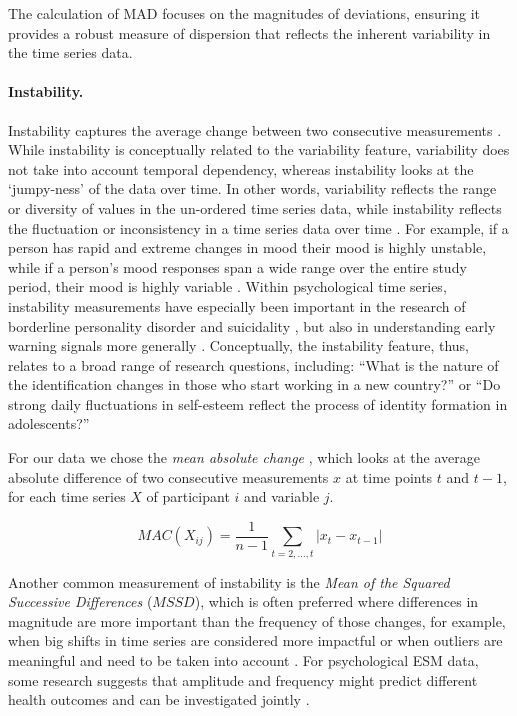 The calculation of MAD focuses on the magnitudes of deviations, ensuring
it provides a robust measure of dispersion that reflects the inherent
variability in the time series data.

\paragraph{Instability.}

Instability captures the average change between two consecutive
measurements \citep{ebner-priemer2009, jahng2008}. While instability is
conceptually related to the variability feature, variability does not
take into account temporal dependency, whereas instability looks at the
`jumpy-ness' of the data over time. In other words, variability reflects
the range or diversity of values in the un-ordered time series data,
while instability reflects the fluctuation or inconsistency in a time
series data over time \citep{trull2008, houben2015, koval2013}. For
example, if a person has rapid and extreme changes in mood their mood is
highly unstable, while if a person's mood responses span a wide range
over the entire study period, their mood is highly variable
\citep[note that this does not need to be rapidly changing or instable, e.g., when there is linear increase over time; also see][]{jahng2008}.
Within psychological time series, instability measurements have
especially been important in the research of borderline personality
disorder \citep{trull2008} and suicidality \citep{kivela2022}, but also
in understanding early warning signals more generally
\citep{wichers2019}. Conceptually, the instability feature, thus,
relates to a broad range of research questions, including: ``What is the
nature of the identification changes in those who start working in a new
country?'' or ``Do strong daily fluctuations in self-esteem reflect the
process of identity formation in adolescents?''

For our data we chose the \textit{mean absolute change}
\citep[$MAC$; e.g.,][]{ebner-priemer2009, barandas2020}, which looks at
the average absolute difference of two consecutive measurements \(x\) at
time points \(t\) and \(t-1\), for each time series \(X\) of participant
\(i\) and variable \(j\).

\begin{equation} \label{eq:mac}
  MAC(X_{ij}) = \frac{1}{n-1} \sum_{t=2, \ldots, t}\left|x_{t}-x_{t-1}\right|
\end{equation}

Another common measurement of instability is the
\textit{Mean of the Squared Successive Differences} (\(MSSD\)), which is
often preferred where differences in magnitude are more important than
the frequency of those changes, for example, when big shifts in time
series are considered more impactful or when outliers are meaningful and
need to be taken into account \citep{chatfield2003, bos2019}. For
psychological ESM data, some research suggests that amplitude and
frequency might predict different health outcomes and can be
investigated jointly \citep{wang2012a, jahng2008}.

